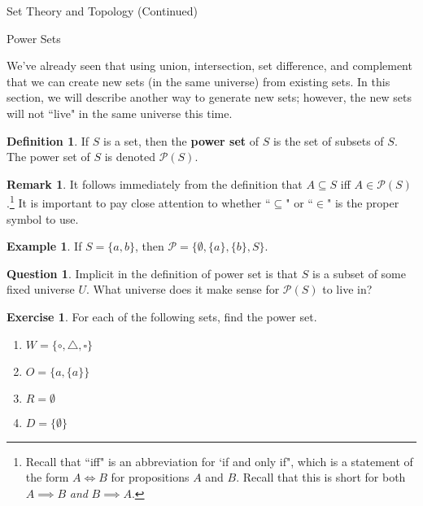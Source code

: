 \documentclass[11pt]{article}
\theoremstyle{definition}
\newtheorem{definition}[theorem]{Definition}
\newtheorem{example}[theorem]{Example}
\newtheorem{exercise}[theorem]{Exercise}
\newtheorem{remark}[theorem]{Remark}
\newtheorem{question}[theorem]{Question}
\begin{document}
\addtocounter{section}{1}

\begin{section}{Set Theory and Topology (Continued)}

\addtocounter{subsection}{1}
\addtocounter{theorem}{27}

\begin{subsection}{Power Sets}

We've already seen that using union, intersection, set difference, and complement that we can create new sets (in the same universe) from existing sets.  In this section, we will describe another way to generate new sets; however, the new sets will not ``live" in the same universe this time.

\begin{definition}
If $S$ is a set, then the \textbf{power set} of $S$ is the set of subsets of $S$.  The power set of $S$ is denoted $\mathcal{P}(S)$.
\end{definition}

\begin{remark}
It follows immediately from the definition that $A\subseteq S$ iff $A\in\mathcal{P}(S)$.\footnote{Recall that ``iff" is an abbreviation for `if and only if", which is a statement of the form $A\iff B$ for propositions $A$ and $B$.  Recall that this is short for both $A\implies B$ \emph{and} $B\implies A$.}  It is important to pay close attention to whether ``$\subseteq$" or ``$\in$" is the proper symbol to use.
\end{remark}

\begin{example}
If $S=\{a,b\}$, then $\mathcal{P}=\{\emptyset, \{a\}, \{b\}, S\}$.
\end{example}

\begin{question}
Implicit in the definition of power set is that $S$ is a subset of some fixed universe $U$.  What universe does it make sense for $\mathcal{P}(S)$ to live in?
\end{question}

\begin{exercise}
For each of the following sets, find the power set.
\begin{enumerate}
\item $W=\{\circ, \triangle, \square\}$
\item $O=\{a,\{a\}\}$
\item $R=\emptyset$
\item $D=\{\emptyset\}$
\end{enumerate}
\end{exercise}


\end{subsection}
\end{section}
\end{document}
